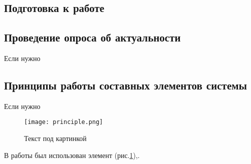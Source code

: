 	\newpage
		\begin{center}	
		\section{Подготовка к работе}
			\end{center}
		\subsection{Проведение опроса об актуальности }
	Если нужно
		
		\subsection{Принципы работы составных элементов системы}
	Если нужно
	
	\begin{figure}[H] 
		\center 
		\texttt{[image: principle.png]} %
		\caption{Текст под картинкой} 
		\label{image:principle}   %
	\end{figure}
	 В работы был использован элемент (рис.\ref{image:principle}),.
	

